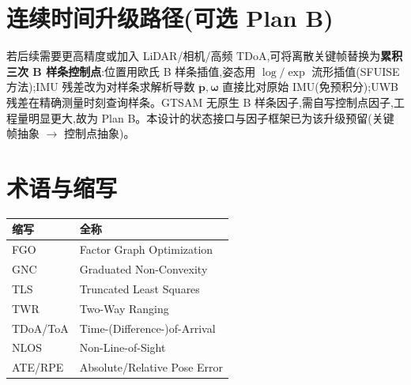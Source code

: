 \documentclass[11pt,a4paper]{report}
\newcommand{\bp}{\bm{p}}
\newcommand{\bw}{\bm{\omega}}
\begin{document}
\appendix
\chapter{连续时间升级路径(可选 Plan B)}\label{app:ct}
若后续需要更高精度或加入 LiDAR/相机/高频 TDoA,可将离散关键帧替换为\textbf{累积三次 B 样条控制点}:位置用欧氏 B 样条插值,姿态用 $\log/\exp$ 流形插值(SFUISE 方法);IMU 残差改为对样条求解析导数 $\ddot{\bp},\bw$ 直接比对原始 IMU(免预积分);UWB 残差在精确测量时刻查询样条。GTSAM 无原生 B 样条因子,需自写控制点因子,工程量明显更大,故为 Plan B。本设计的状态接口与因子框架已为该升级预留(关键帧抽象 $\to$ 控制点抽象)。

\chapter{术语与缩写}
\begin{longtable}{l l}
\toprule
缩写 & 全称 \\
\midrule
FGO & Factor Graph Optimization \\
GNC & Graduated Non-Convexity \\
TLS & Truncated Least Squares \\
TWR & Two-Way Ranging \\
TDoA/ToA & Time-(Difference-)of-Arrival \\
NLOS & Non-Line-of-Sight \\
ATE/RPE & Absolute/Relative Pose Error \\
\bottomrule
\end{longtable}
\end{document}
